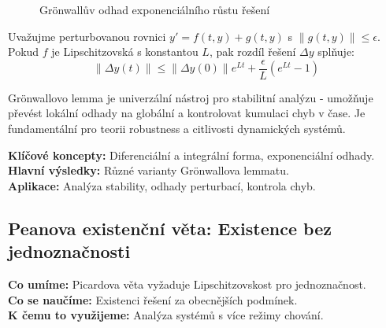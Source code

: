 \begin{figure}[htbp]
\centering
{}
\caption{Grönwallův odhad exponenciálního růstu řešení}
\label{fig:gronwall-estimate}
\end{figure}

\begin{example}
Uvažujme perturbovanou rovnici $y' = f(t,y) + g(t,y)$ s $\|g(t,y)\| \leq \epsilon$. Pokud $f$ je Lipschitzovská s konstantou $L$, pak rozdíl řešení $\Delta y$ splňuje:
\[
\|\Delta y(t)\| \leq \|\Delta y(0)\|e^{Lt} + \frac{\epsilon}{L}(e^{Lt} - 1)
\]
\end{example}

\begin{keyinsight}
Grönwallovo lemma je univerzální nástroj pro stabilitní analýzu - umožňuje převést lokální odhady na globální a kontrolovat kumulaci chyb v čase. Je fundamentální pro teorii robustness a citlivosti dynamických systémů.
\end{keyinsight}

\begin{summary}
\textbf{Klíčové koncepty:} Diferenciální a integrální forma, exponenciální odhady. \\
\textbf{Hlavní výsledky:} Různé varianty Grönwallova lemmatu. \\
\textbf{Aplikace:} Analýza stability, odhady perturbací, kontrola chyb.
\end{summary}

\spc

\subsection{Peanova existenční věta: Existence bez jednoznačnosti}

\begin{scaffold}
\textbf{Co umíme:} Picardova věta vyžaduje Lipschitzovskost pro jednoznačnost. \\
\textbf{Co se naučíme:} Existenci řešení za obecnějších podmínek. \\
\textbf{K čemu to využijeme:} Analýza systémů s více režimy chování.
\end{scaffold}

